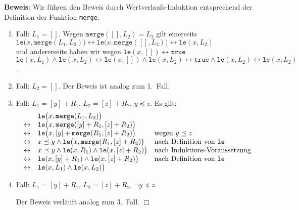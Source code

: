 \noindent
\textbf{Beweis}: Wir f\"uhren den Beweis durch Wertverlaufs-Induktion entsprechend der Definition
der Funktion \texttt{merge}.
\begin{enumerate}
\item Fall: $L_1 = []$.  Wegen $\texttt{merge}([],L_2) = L_2$ gilt einerseits \\[0.1cm]
      \hspace*{1.3cm} 
       $\texttt{le}\bigl(x,\texttt{merge}(L_1,L_2)\bigr) \leftrightarrow \texttt{le}\bigl(x,\texttt{merge}([],L_2)\bigr) \leftrightarrow \texttt{le}(x,L_2)$ \\[0.1cm]
       und andererseits haben wir wegen $\texttt{le}(x,[]) \leftrightarrow \mathtt{true}$ \\[0.1cm]
       \hspace*{1.3cm} 
       $\texttt{le}(x,L_1) \wedge \mathtt{le}(x,L_2) \leftrightarrow \texttt{le}(x,[])
       \wedge \mathtt{le}(x,L_2) \leftrightarrow \mathtt{true} \wedge \mathtt{le}(x,L_2) \leftrightarrow \mathtt{le}(x,L_2)$.
\item Fall: $L_2 = []$.  Der Beweis ist analog zum 1.~Fall.
\item Fall: $L_1 = [y] + R_1$, $L_2 = [z] + R_2$, $y \preceq z$.  Es gilt:
      \[
      \begin{array}{cll}
         & \mathtt{le}\bigl(x, \mathtt{merge}(L_1, L_2) \bigr)\\
       \leftrightarrow & \mathtt{le}\bigl(x, \mathtt{merge}([y]+R_1, [z]+R_2) \bigr)\\
       \leftrightarrow & \mathtt{le}\bigl(x, [y] + \mathtt{merge}(R_1, [z]+R_2) \bigr) &
                         \mbox{wegen $y \preceq z$} \\
       \leftrightarrow & x \preceq y \wedge \mathtt{le}\bigl(x, \mathtt{merge}(R_1, [z]+R_2) \bigr) &
                         \mbox{nach Definition von \texttt{le}} \\
       \leftrightarrow & x \preceq y \wedge \mathtt{le}(x, R_1) \wedge \mathtt{le}(x, [z]+R_2) \bigr) &
                         \mbox{nach Induktions-Voraussetzung} \\
       \leftrightarrow &  \mathtt{le}(x, [y] + R_1) \wedge \mathtt{le}(x, [z]+R_2) \bigr) &
                         \mbox{nach Definition von \texttt{le}} \\
       \leftrightarrow &  \mathtt{le}(x, L_1) \wedge \mathtt{le}(x, L_2) \bigr) 
      \end{array}
      \]
\item Fall:  $L_1 = [y] + R_1$, $L_2 = [z] + R_2$, $\neg y \preceq z$.  

      Der Beweis verl\"auft analog zum 3.~Fall. \hspace*{\fill} $\Box$
\end{enumerate}

